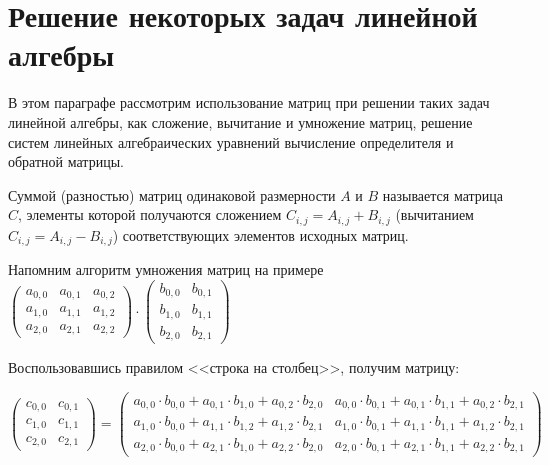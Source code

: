 \section[Решение некоторых задач линейной алгебры]{Решение некоторых задач линейной алгебры}\label{ch06:4}
В этом параграфе рассмотрим использование матриц при решении таких задач линейной алгебры, как сложение, вычитание и
умножение матриц, решение систем линейных алгебраических уравнений вычисление определителя и обратной матрицы. 


Суммой (разностью) матриц одинаковой размерности $A$ и $B$ называется матрица $C$, элементы которой получаются сложением 
$C_{i,j}=A_{i,j}+B_{i,j}$ (вычитанием  $C_{i,j}=A_{i,j}-B_{i,j}$) соответствующих элементов исходных матриц. 

Напомним алгоритм умножения матриц на примере\\ 
{\small $\left(\begin{matrix}a_{0,0}&a_{0,1}&a_{0,2}\\a_{1,0}&a_{1,1}&a_{1,2}\\a_{2,0}&a_{2,1}&a_{2,2}\end{matrix}\right)\cdot
\left(\begin{matrix}b_{0,0}&b_{0,1}\\b_{1,0}&b_{1,1}\\b_{2,0}&b_{2,1}\end{matrix}\right)$ 
}

Воспользовавшись правилом <<строка на столбец>>, получим матрицу: 

{\noindent\small
$\left(\begin{matrix}c_{0,0}&c_{0,1}\\c_{1,0}&c_{1,1}\\c_{2,0}&c_{2,1}\end{matrix}\right)=
\left(\begin{matrix}a_{0,0}\cdot
b_{0,0}+a_{0,1}\cdot b_{1,0}+a_{0,2}\cdot b_{2,0}&a_{0,0}\cdot b_{0,1}+a_{0,1}\cdot b_{1,1}+a_{0,2}\cdot
b_{2,1}\\a_{1,0}\cdot b_{0,0}+a_{1,1}\cdot b_{1,2}+a_{1,2}\cdot b_{2,1}&a_{1,0}\cdot b_{0,1}+a_{1,1}\cdot
b_{1,1}+a_{1,2}\cdot b_{2,1}\\a_{2,0}\cdot b_{0,0}+a_{2,1}\cdot b_{1,0}+a_{2,2}\cdot b_{2,0}&a_{2,0}\cdot
b_{0,1}+a_{2,1}\cdot b_{1,1}+a_{2,2}\cdot b_{2,1}\end{matrix}\right)$
}

